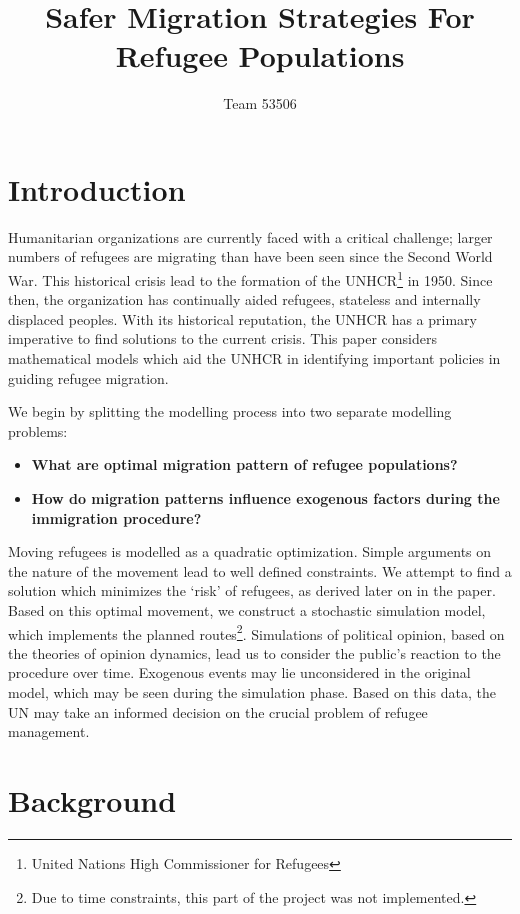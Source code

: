\documentclass{article}
\title{Safer Migration Strategies For Refugee Populations}
\author{Team 53506}
\begin{document}

\maketitle
\tableofcontents
\newpage


\section{Introduction}

Humanitarian organizations are currently faced with a critical challenge; larger numbers of refugees are migrating than have been seen since the Second World War\cite{simpson}. This historical crisis lead to the formation of the UNHCR\footnote{United Nations High Commissioner for Refugees} in 1950\cite{historyUNHCR}. Since then, the organization has continually aided refugees, stateless and internally displaced peoples. With its historical reputation, the UNHCR has a primary imperative to find solutions to the current crisis. This paper considers mathematical models which aid the UNHCR in identifying important policies in guiding refugee migration.

We begin by splitting the modelling process into two separate modelling problems:
%
\begin{itemize}
    \item {\bf What are optimal migration pattern of refugee populations?}
    \item {\bf How do migration patterns influence exogenous factors during the immigration procedure?}
\end{itemize}
%
Moving refugees is modelled as a quadratic optimization. Simple arguments on the nature of the movement lead to well defined constraints. We attempt to find a solution which minimizes the `risk' of refugees, as derived later on in the paper. Based on this optimal movement, we construct a stochastic simulation model, which implements the planned routes\footnote{Due to time constraints, this part of the project was not implemented.}. Simulations of political opinion, based on the theories of opinion dynamics, lead us to consider the public's reaction to the procedure over time. Exogenous events may lie unconsidered in the original model, which may be seen during the simulation phase. Based on this data, the UN may take an informed decision on the crucial problem of refugee management.

\section{Background}
\end{document}
